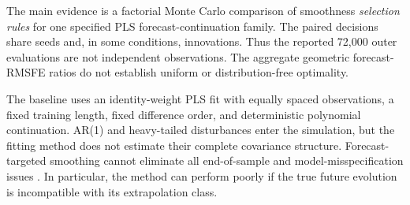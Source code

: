 The main evidence is a factorial Monte Carlo
comparison of smoothness \emph{selection rules}
for one specified PLS forecast-continuation
family. The paired decisions share seeds
and, in some conditions, innovations.
Thus the reported 72,000 outer evaluations
are not independent observations.
The aggregate geometric forecast-RMSFE
ratios do not establish uniform or
distribution-free optimality.

The baseline uses an identity-weight
PLS fit with equally spaced observations,
a fixed training length, fixed difference
order, and deterministic polynomial
continuation. AR(1) and heavy-tailed
disturbances enter the simulation, but
the fitting method does not estimate
their complete covariance structure.
Forecast-targeted smoothing cannot
eliminate all end-of-sample and
model-misspecification issues
\citep{hamilton2018hp}.
In particular, the method can perform
poorly if the true future evolution
is incompatible with its extrapolation
class.

